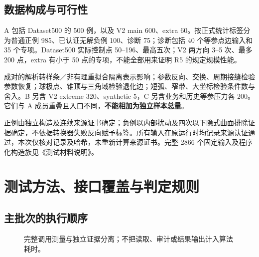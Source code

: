 \documentclass[UTF8,zihao=5,fontset=windows,a4paper]{ctexart}
\begin{document}
\subsection{数据构成与可行性}
A 包括 Dataset500 的 500 例，以及 V2 main 600、extra 60。按正式统计标签分为普通正例 985、已认证无解负例 100、诊断 75；诊断包括 40 个等参点边输入和 35 个专项。Dataset500 实际控制点 50--196、最高五次；V2 两方向 3--5 次、最多 200 点，extra 有小于 50 点的专项，不能全部用来证明 R5 的规定规模性能。

成对的解析转样条／非有理重拟合隔离表示影响；参数反向、交换、周期接缝检验参数恢复；球极点、锥顶与三角域检验退化边；短弧、窄带、大坐标检验条件数与舍入。B 另含 V2 extreme 320、synthetic 5，C 另含业务和历史等参压力各 200。它们与 A 成员重叠且入口不同，\textbf{不能相加为独立样本总量}。

正例由独立构造及连续来源证书确定；负例以内部扰动及四次以下隐式曲面排除证据确定，不依据转换器失败反向赋予标签。所有输入在原运行时均记录来源认证通过，本次仅核对记录及哈希，未重新计算来源证书。完整 2866 个固定输入及程序化构造族见《测试材料说明》。

\newpage
\section{测试方法、接口覆盖与判定规则}
\subsection{主批次的执行顺序}
\begin{figure}[h]\centering
{}
\caption{完整调用测量与独立证据分离；不把读取、审计或结果输出计入算法耗时。}
\end{figure}
\end{document}
